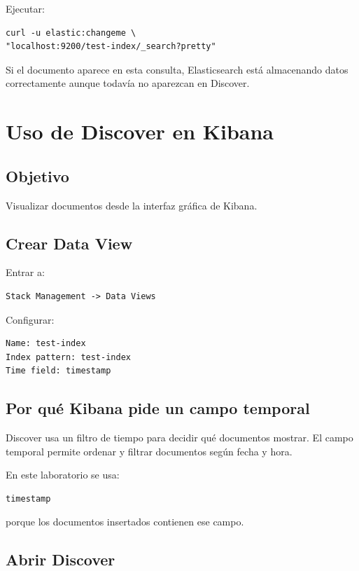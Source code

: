 \documentclass[
  coursetitle={Cómputo Nube y Tecnologías Emergentes},
  coursehours={96},
  coursedate={Verano 2026},
  doctype={Práctica},
  otherlangs={english,french},
  authorname={Lázaro},
  authorsurname={Bustio-Martínez},
  authortitle={PhD},
  role={Profesor Investigador},
  email={lbustio@inaoe.mx},
  phone={5559504000},
  ext={7459},
  institution={Instituto Nacional de Astrofísica, Óptica y Electrónica (INAOE)},
  department={Maestría en Ciencias en Tecnologías de Seguridad},
  address={Luis Enrique Erro 1, Sta. Ma. Tonantzintla, San Andrés Cholula, CP 72840, Puebla, México},
  margin={0.5in}
]{../../lbustio_lecture_notes}
\begin{document}
Ejecutar:

\begin{lstlisting}
curl -u elastic:changeme \
"localhost:9200/test-index/_search?pretty"
\end{lstlisting}

Si el documento aparece en esta consulta, Elasticsearch está almacenando datos correctamente aunque todavía no aparezcan en Discover.

\section{Uso de Discover en Kibana}

\subsection{Objetivo}

Visualizar documentos desde la interfaz gráfica de Kibana.

\subsection{Crear Data View}

Entrar a:

\begin{verbatim}
Stack Management -> Data Views
\end{verbatim}

Configurar:

\begin{verbatim}
Name: test-index
Index pattern: test-index
Time field: timestamp
\end{verbatim}

\subsection{Por qué Kibana pide un campo temporal}

Discover usa un filtro de tiempo para decidir qué documentos mostrar. El campo temporal permite ordenar y filtrar documentos según fecha y hora.

En este laboratorio se usa:

\begin{verbatim}
timestamp
\end{verbatim}

porque los documentos insertados contienen ese campo.

\subsection{Abrir Discover}
\end{document}
